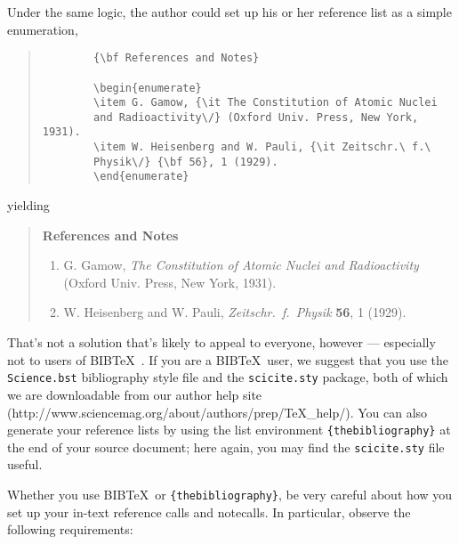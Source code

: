 \documentclass[12pt]{article}
\begin{document}
	Under the same logic, the author could set up his or her reference list as a simple enumeration,
	
	\begin{quote}
		\begin{verbatim}
		{\bf References and Notes}
		
		\begin{enumerate}
		\item G. Gamow, {\it The Constitution of Atomic Nuclei
		and Radioactivity\/} (Oxford Univ. Press, New York, 1931).
		\item W. Heisenberg and W. Pauli, {\it Zeitschr.\ f.\ 
		Physik\/} {\bf 56}, 1 (1929).
		\end{enumerate}
		\end{verbatim}
	\end{quote}
	
	\noindent yielding
	
	\begin{quote}
		{\bf References and Notes}
		
		\begin{enumerate}
			\item G. Gamow, {\it The Constitution of Atomic Nuclei and
				Radioactivity\/} (Oxford Univ. Press, New York, 1931).
			\item W. Heisenberg and W. Pauli, {\it Zeitschr.\ f.\ Physik} {\bf 56},
			1 (1929).
		\end{enumerate}
	\end{quote}
	
	That's not a solution that's likely to appeal to everyone, however ---
	especially not to users of B{\small{IB}}\TeX\ \cite{inclme}.  If you
	are a B{\small{IB}}\TeX\ user, we suggest that you use the
	\texttt{Science.bst} bibliography style file and the
	\texttt{scicite.sty} package, both of which we are downloadable from our author help site
	(http://www.sciencemag.org/about/authors/prep/TeX\_help/).  You can also
	generate your reference lists by using the list environment
	\texttt{\{thebibliography\}} at the end of your source document; here
	again, you may find the \texttt{scicite.sty} file useful.
	
	Whether you use B{\small{IB}}\TeX\ or \texttt{\{thebibliography\}}, be
	very careful about how you set up your in-text reference calls and
	notecalls.  In particular, observe the following requirements:
	
\end{document}

